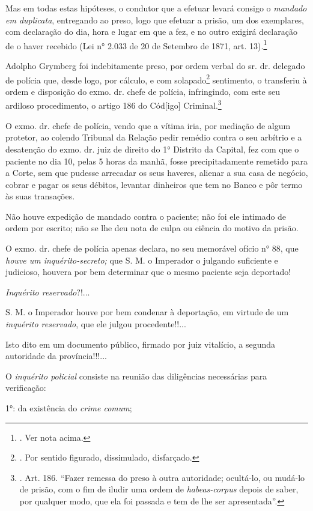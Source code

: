 Mas em todas estas hipóteses, o condutor que a efetuar levará consigo o
\emph{mandado em duplicata}, entregando ao preso, logo que efetuar a
prisão, um dos exemplares, com declaração do dia, hora e lugar em que a
fez, e no outro exigirá declaração de o haver recebido (Lei n° 2.033 de
20 de Setembro de 1871, art. 13).\footnote{. Ver nota acima.}

Adolpho Grymberg foi indebitamente preso, por ordem verbal do sr. dr.
delegado de polícia que, desde logo, por cálculo, e com
solapado\footnote{. Por sentido figurado, dissimulado, disfarçado.}
sentimento, o transferiu à ordem e disposição do exmo. dr. chefe de
polícia, infringindo, com este seu ardiloso procedimento, o artigo 186
do Cód{[}igo{]} Criminal.\footnote{. Art. 186. ``Fazer remessa do preso
  à outra autoridade; ocultá-lo, ou mudá-lo de prisão, com o fim de
  iludir uma ordem de \emph{habeas-corpus} depois de saber, por qualquer
  modo, que ela foi passada e tem de lhe ser apresentada''.}

O exmo. dr. chefe de polícia, vendo que a vítima iria, por mediação de
algum protetor, ao colendo Tribunal da Relação pedir remédio contra o
seu arbítrio e a desatenção do exmo. dr. juiz de direito do 1° Distrito
da Capital, fez com que o paciente no dia 10, pelas 5 horas da manhã,
fosse precipitadamente remetido para a Corte, sem que pudesse arrecadar
os seus haveres, alienar a sua casa de negócio, cobrar e pagar os seus
débitos, levantar dinheiros que tem no Banco e pôr termo às suas
transações.

Não houve expedição de mandado contra o paciente; não foi ele intimado
de ordem por escrito; não se lhe deu nota de culpa ou ciência do motivo
da prisão.

O exmo. dr. chefe de polícia apenas declara, no seu memorável ofício n°
88, que \emph{houve um inquérito-secreto;} que S. M. o Imperador o
julgando suficiente e judicioso, houvera por bem determinar que o mesmo
paciente seja deportado!

\emph{Inquérito reservado}?!...

S. M. o Imperador houve por bem condenar à deportação, em virtude de um
\emph{inquérito reservado}, que ele julgou procedente!!...

Isto dito em um documento público, firmado por juiz vitalício, a segunda
autoridade da província!!!...

O \emph{inquérito policial} consiste na reunião das diligências
necessárias para verificação:

1°: da existência do \emph{crime comum};

